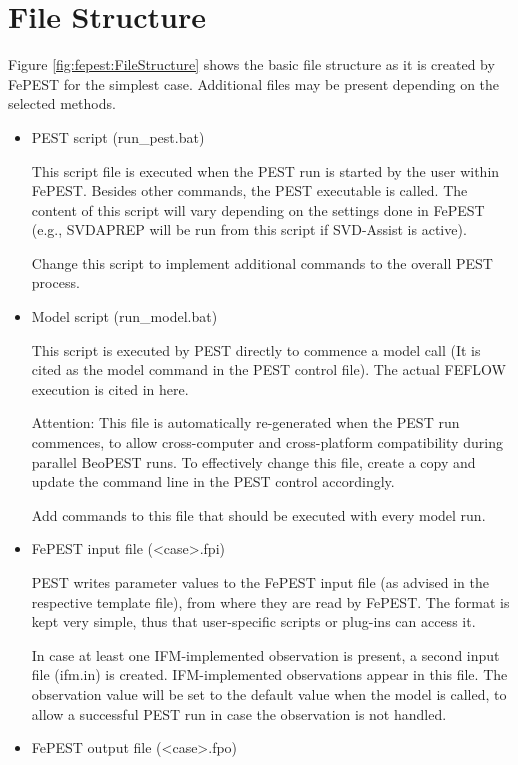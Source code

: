 \section{File Structure}

Figure \ref{fig:fepest:FileStructure} shows the basic file structure as it is created by FePEST for the simplest case. Additional files may be present depending on the selected methods.

\begin{itemize} 
\item PEST script (run\_pest.bat)

This script file is executed when the PEST run is started by the user within FePEST. Besides other commands, the PEST executable is called. The content of this script will vary depending on the settings done in FePEST (e.g., SVDAPREP will be run from this script if SVD-Assist is active).

Change this script to implement additional commands to the overall PEST process.

\item Model script (run\_model.bat)

This script is executed by PEST directly to commence a model call (It is cited as the model command in the PEST control file). The actual FEFLOW execution is cited in here.

Attention: This file is automatically re-generated when the PEST run commences, to allow cross-computer and cross-platform compatibility during parallel BeoPEST runs. To effectively change this file, create a copy and update the command line in the PEST control accordingly.

Add commands to this file that should be executed with every model run.

\item FePEST input file (\textless  case\textgreater.fpi)	

PEST writes parameter values to the FePEST input file (as advised in the respective template file), from where they are read by FePEST. The format is kept very simple, thus that user-specific scripts or plug-ins can access it. 

In case at least one IFM-implemented observation is present, a second input file (ifm.in) is created. IFM-implemented observations appear in this file. The observation value will be set to the default value when the model is called, to allow a successful PEST run in case the observation is not handled.

\item FePEST output file (\textless  case\textgreater.fpo)


\end{itemize}
